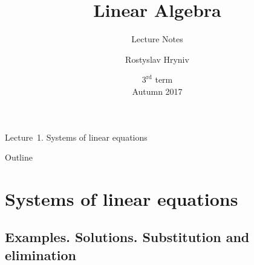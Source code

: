 \documentclass%
[handout]%
{beamer}
\title{Linear Algebra}
\subtitle{Lecture Notes} %
\author[R.~Hryniv] %
{Rostyslav Hryniv}
\institute[IAPMM]%
{
  Ukrainian Catholic University\\
  Computer Science Programme
}
\date%
{$3^{\mathrm{rd}}$ term\\ Autumn 2017}
\begin{document}
\begin{frame}
\thispagestyle{empty}
  \titlepage
\end{frame}




\begin{frame}

\begin{center}
	Lecture~1. Systems of linear equations
\end{center}

\end{frame}

\begin{frame}[label=outline]{Outline}
\setcounter{tocdepth}{2}
  \tableofcontents%
\end{frame}


\section{Systems of linear equations}


\subsection{Examples. Solutions. Substitution and elimination}
\end{document}
